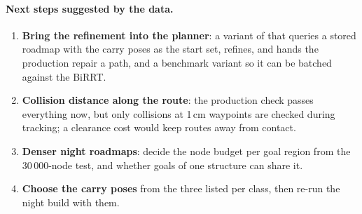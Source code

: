 \paragraph{Next steps suggested by the data.}
\begin{enumerate}[nosep]
  \item \textbf{Bring the refinement into the planner}: a  variant of
         that queries a stored roadmap with the carry
        poses as the start set, refines, and hands the production repair a path, and
        a benchmark variant so it can be batched against the BiRRT.
  \item \textbf{Collision distance along the route}: the production check passes
        everything now, but only collisions at 1\,cm waypoints are checked during
        tracking; a clearance cost would keep routes away from contact.
  \item \textbf{Denser night roadmaps}: decide the node budget per goal region from
        the 30\,000-node test, and whether goals of one structure can share it.
  \item \textbf{Choose the carry poses} from the three listed per class, then
        re-run the night build with them.
\end{enumerate}
